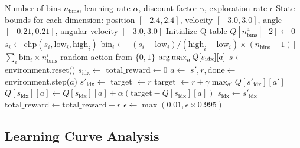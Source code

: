 \begin{algorithm}[htbp]
\caption{Q-Learning with State Discretization for CartPole}
\label{alg:qlearning_cartpole}
\begin{algorithmic}[1]
\Require Number of bins $n_{\text{bins}}$, learning rate $\alpha$, discount factor $\gamma$, exploration rate $\epsilon$
\Require State bounds for each dimension: position $[-2.4, 2.4]$, velocity $[-3.0, 3.0]$, angle $[-0.21, 0.21]$, angular velocity $[-3.0, 3.0]$
\State Initialize Q-table $Q[n_{\text{bins}}^4][2] \gets 0$
        \State $s_i \gets \text{clip}(s_i, \text{low}_i, \text{high}_i)$
        \State $\text{bin}_i \gets \lfloor (s_i - \text{low}_i) / (\text{high}_i - \text{low}_i) \times (n_{\text{bins}} - 1) \rfloor$
    \EndFor
    \State \Return $\sum_i \text{bin}_i \times n_{\text{bins}}^i$
\EndFunction
{}
        \State \Return random action from $\{0, 1\}$
    \Else
        \State \Return $\operatorname*{arg\,max}_a Q[s_{\text{idx}}][a]$
    \EndIf
\EndFunction
{}
    \State $s \gets$ environment.reset()
    \State $s_{\text{idx}} \gets$ 
    \State $\text{total\_reward} \gets 0$
        \State $a \gets$ 
        \State $s', r, \text{done} \gets$ environment.step($a$)
        \State $s'_{\text{idx}} \gets$ 
            \State target $\gets r$
        \Else
            \State target $\gets r + \gamma \max_{a'} Q[s'_{\text{idx}}][a']$
        \EndIf
        \State $Q[s_{\text{idx}}][a] \gets Q[s_{\text{idx}}][a] + \alpha (\text{target} - Q[s_{\text{idx}}][a])$
        \State $s_{\text{idx}} \gets s'_{\text{idx}}$
        \State $\text{total\_reward} \gets \text{total\_reward} + r$
    \EndWhile
    \State $\epsilon \gets \max(0.01, \epsilon \times 0.995)$ 
\EndFor
\end{algorithmic}
\end{algorithm}

\subsection{Learning Curve Analysis}

